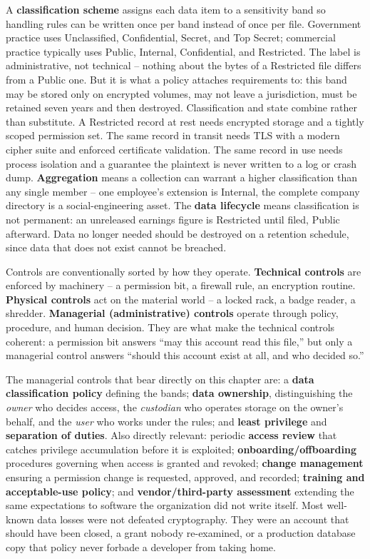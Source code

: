 A \textbf{classification scheme} assigns each data item to a sensitivity band so handling rules can
be written once per band instead of once per file. Government practice uses Unclassified,
Confidential, Secret, and Top Secret; commercial practice typically uses Public, Internal,
Confidential, and Restricted. The label is administrative, not technical -- nothing about the bytes
of a Restricted file differs from a Public one. But it is what a policy attaches requirements to:
this band may be stored only on encrypted volumes, may not leave a jurisdiction, must be retained
seven years and then destroyed. Classification and state combine rather than substitute. A
Restricted record at rest needs encrypted storage and a tightly scoped permission set. The same
record in transit needs TLS with a modern cipher suite and enforced certificate validation. The same
record in use needs process isolation and a guarantee the plaintext is never written to a log or
crash dump. \textbf{Aggregation} means a collection can warrant a higher classification than any
single member -- one employee's extension is Internal, the complete company directory is a
social-engineering asset. The \textbf{data lifecycle} means classification is not permanent: an
unreleased earnings figure is Restricted until filed, Public afterward. Data no longer needed
should be destroyed on a retention schedule, since data that does not exist cannot be breached.

Controls are conventionally sorted by how they operate. \textbf{Technical controls} are enforced by
machinery -- a permission bit, a firewall rule, an encryption routine. \textbf{Physical controls}
act on the material world -- a locked rack, a badge reader, a shredder. \textbf{Managerial
(administrative) controls} operate through policy, procedure, and human decision. They are what make
the technical controls coherent: a permission bit answers ``may this account read this file,'' but
only a managerial control answers ``should this account exist at all, and who decided so.''

The managerial controls that bear directly on this chapter are: a \textbf{data classification policy}
defining the bands; \textbf{data ownership}, distinguishing the \emph{owner} who decides access, the
\emph{custodian} who operates storage on the owner's behalf, and the \emph{user} who works under the
rules; and \textbf{least privilege} and \textbf{separation of duties}. Also directly relevant: periodic
\textbf{access review} that catches privilege accumulation before it is exploited;
\textbf{onboarding/offboarding} procedures governing when access is granted and revoked;
\textbf{change management} ensuring a permission change is requested, approved, and recorded;
\textbf{training and acceptable-use policy}; and \textbf{vendor/third-party assessment} extending the
same expectations to software the organization did not write itself. Most well-known data losses
were not defeated cryptography. They were an account that should have been closed, a grant nobody
re-examined, or a production database copy that policy never forbade a developer from taking home.

